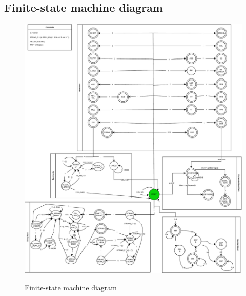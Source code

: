 \subsection{Finite-state machine diagram}
\vspace*{\fill}
\begin{figure}[ht!]
\begin{center}
    \label{fsm_diagram}
    \includegraphics[width=\textwidth, keepaspectratio]{images/fsm_draft.pdf}
    \caption{Finite-state machine diagram}
\end{center}
\end{figure}
\vspace*{\fill}

\newpage